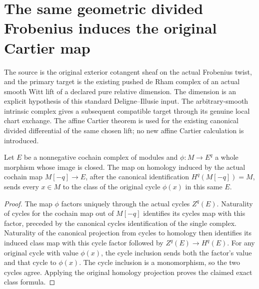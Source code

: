 \section{The same geometric divided Frobenius induces the original Cartier map}

The source is the original exterior cotangent sheaf on the actual
Frobenius twist, and the primary target is the existing pushed de Rham
complex of an actual smooth Witt lift of a declared pure relative
dimension. The dimension is an explicit hypothesis of this standard
Deligne--Illusie input. The arbitrary-smooth intrinsic complex gives a
subsequent compatible target through its genuine local chart exchange. The affine Cartier theorem is used for the existing
canonical divided differential of the same chosen lift; no new affine
Cartier calculation is introduced.

\begin{lemma}
\label{lem:di-single-map-original-cycle-class}
\leanok
Let $E$ be a nonnegative cochain complex of modules and
$\phi:M\to E^q$ a whole morphism whose image is closed. The map on
homology induced by the actual cochain map $M[-q]\to E$, after the
canonical identification $H^q(M[-q])=M$, sends every $x\in M$ to the
class of the original cycle $\phi(x)$ in this same $E$.
\end{lemma}
\begin{proof}
The map $\phi$ factors uniquely through the actual cycles $Z^q(E)$.
Naturality of cycles for the cochain map out of $M[-q]$ identifies its
cycles map with this factor, preceded by the canonical cycles
identification of the single complex. Naturality of the canonical
projection from cycles to homology then identifies its induced class
map with this cycle factor followed by $Z^q(E)\to H^q(E)$.
For any original cycle with value $\phi(x)$, the cycle inclusion sends
both the factor's value and that cycle to $\phi(x)$. The cycle inclusion
is a monomorphism, so the two cycles agree. Applying the original
homology projection proves the claimed exact class formula.
\end{proof}

